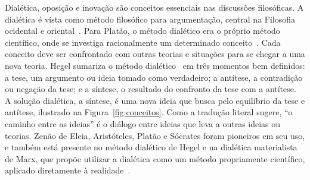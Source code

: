Dialética, oposição e inovação são conceitos essenciais nas discussões
filosóficas. A dialética é vista como método filosófico para
argumentação, central na Filosofia ocidental e
oriental~\cite{deleuze,pinto,van}. Para Platão, o método dialético era
o próprio método científico, onde se investiga racionalmente um
determinado conceito~\cite{pinto}. Cada conceito deve ser confrontado com outras
teorias e situações para se chegar a uma nova teoria. Hegel sumariza o
método dialético~\cite{van} em três momentos bem definidos: a tese, um argumento
ou ideia tomado como verdadeiro; a antítese, a contradição ou negação
da tese; e a síntese, o resultado do confronto da tese com a
antítese. A solução dialética, a síntese, é uma nova ideia que busca
pelo equilíbrio da tese e antítese, ilustrado na
Figura~\ref{fig:conceitos}. Como a tradução literal sugere, ``o
caminho entre as ideias'' é o diálogo entre ideias que leva a outras
ideias ou teorias. Zenão de Eleia, Aristóteles, Platão e Sócrates
foram pioneiros em seu uso, e também está presente no método dialético
de Hegel e na dialética materialista de Marx, que propõe utilizar a
dialética como um método propriamente científico, aplicado diretamente
à realidade~\cite{dialectics}.

